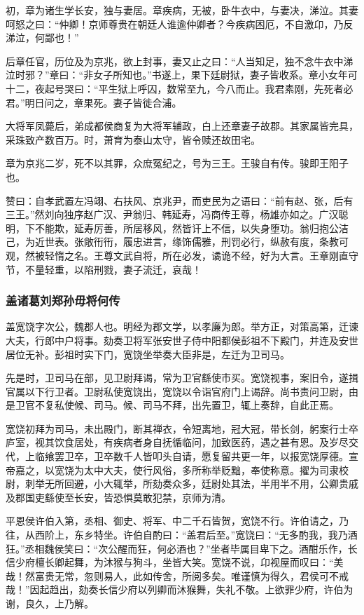 \documentclass[]{article}
\begin{document}
初，章为诸生学长安，独与妻居。章疾病，无被，卧牛衣中，与妻决，涕泣。其妻呵怒之曰：``仲卿！京师尊贵在朝廷人谁逾仲卿者？今疾病困厄，不自激卬，乃反涕泣，何鄙也！''

后章任官，历位及为京兆，欲上封事，妻又止之曰：``人当知足，独不念牛衣中涕泣时邪？''章曰：``非女子所知也。''书遂上，果下廷尉狱，妻子皆收系。章小女年可十二，夜起号哭曰：``平生狱上呼囚，数常至九，今八而止。我君素刚，先死者必君。''明日问之，章果死。妻子皆徙合浦。

大将军凤薨后，弟成都侯商复为大将军辅政，白上还章妻子故郡。其家属皆完具，采珠致产数百万。时，萧育为泰山太守，皆令赎还故田宅。

章为京兆二岁，死不以其罪，众庶冤纪之，号为三王。王骏自有传。骏即王阳子也。

赞曰：自孝武置左冯翊、右扶风、京兆尹，而吏民为之语曰：``前有赵、张，后有三王。''然刘向独序赵广汉、尹翁归、韩延寿，冯商传王尊，杨雄亦如之。广汉聪明，下不能欺，延寿厉善，所居移风，然皆讦上不信，以失身堕功。翁归抱公洁己，为近世表。张敞衎衎，履忠进言，缘饰儒雅，刑罚必行，纵赦有度，条教可观，然被轻惰之名。王尊文武自将，所在必发，谲诡不经，好为大言。王章刚直守节，不量轻重，以陷刑戮，妻子流迁，哀哉！

\hypertarget{header-n5478}{%
\subsubsection{盖诸葛刘郑孙毋将何传}\label{header-n5478}}

盖宽饶字次公，魏郡人也。明经为郡文学，以孝廉为郎。举方正，对策高第，迁谏大夫，行郎中户将事。劾奏卫将军张安世子侍中阳都侯彭祖不下殿门，并连及安世居位无补。彭祖时实下门，宽饶坐举奏大臣非是，左迁为卫司马。

先是时，卫司马在部，见卫尉拜谒，常为卫官繇使市买。宽饶视事，案旧令，遂揖官属以下行卫者。卫尉私使宽饶出，宽饶以令诣官府门上谒辞。尚书责问卫尉，由是卫官不复私使候、司马。候、司马不拜，出先置卫，辄上奏辞，自此正焉。

宽饶初拜为司马，未出殿门，断其禅衣，令短离地，冠大冠，带长剑，躬案行士卒庐室，视其饮食居处，有疾病者身自抚循临问，加致医药，遇之甚有恩。及岁尽交代，上临飨罢卫卒，卫卒数千人皆叩头自请，愿复留共更一年，以报宽饶厚德。宣帝嘉之，以宽饶为太中大夫，使行风俗，多所称举贬黜，奉使称意。擢为司隶校尉，刺举无所回避，小大辄举，所劾奏众多，廷尉处其法，半用半不用，公卿贵戚及郡国吏繇使至长安，皆恐惧莫敢犯禁，京师为清。

平恩侯许伯入第，丞相、御史、将军、中二千石皆贺，宽饶不行。许伯请之，乃往，从西阶上，东乡特坐。许伯自酌曰：``盖君后至。''宽饶曰：``无多酌我，我乃酒狂。''丞相魏侯笑曰：``次公醒而狂，何必酒也？''坐者毕属目卑下之。酒酣乐作，长信少府檀长卿起舞，为沐猴与狗斗，坐皆大笑。宽饶不说，卬视屋而叹曰：``美哉！然富贵无常，忽则易人，此如传舍，所阅多矣。唯谨慎为得久，君侯可不戒哉！''因起趋出，劾奏长信少府以列卿而沐猴舞，失礼不敬。上欲罪少府，许伯为谢，良久，上乃解。
\end{document}
